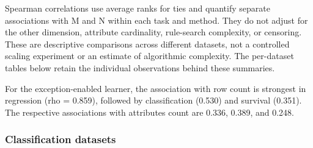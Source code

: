 Spearman correlations use average ranks for ties and quantify separate
associations with M and N within each task and method. They do not adjust for
the other dimension, attribute cardinality, rule-search complexity, or censoring.
These are descriptive comparisons across different datasets, not a controlled
scaling experiment or an estimate of algorithmic complexity. The per-dataset
tables below retain the individual observations behind these summaries.

For the exception-enabled learner, the association with row count is strongest
in regression (rho = 0.859), followed by classification (0.530) and survival
(0.351). The respective associations with attributes count are 0.336, 0.389,
and 0.248. 


\subsubsection{Classification datasets}
\begingroup
\footnotesize
\setlength{\tabcolsep}{3pt}
